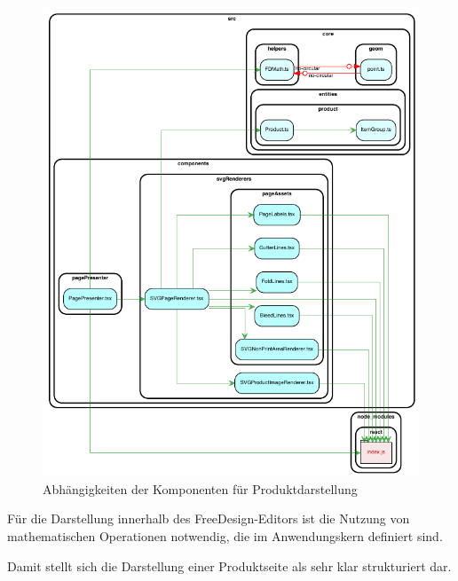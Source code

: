\begin{figure}[H]
    \centering
    \includegraphics{diagrams/Ist-Architektur/page-presenter-analysis.pdf}
    \caption{Abhängigkeiten der Komponenten für Produktdarstellung}
    \label{fig:Produktdarstellung}
\end{figure}
 
Für die Darstellung innerhalb des FreeDesign-Editors ist die Nutzung von mathematischen Operationen notwendig, die im Anwendungskern definiert sind. 

Damit stellt sich die Darstellung einer Produktseite als sehr klar strukturiert dar. 